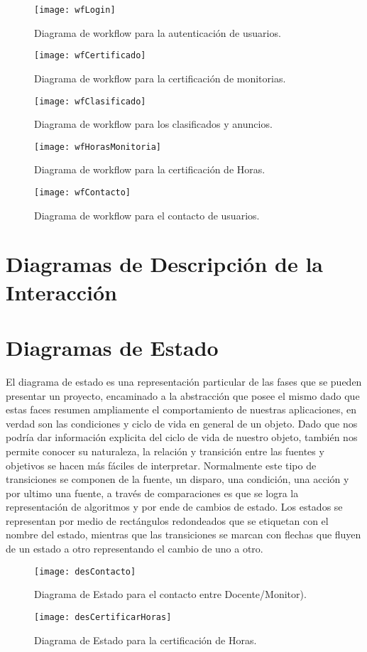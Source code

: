 \begin{figure}[H]
	\centering
	\texttt{[image: wfLogin]}
	\centering
	\caption{Diagrama de workflow para la autenticación de usuarios.}
	\label{fig:wfLogin}
\end{figure}
\begin{figure}[H]
	\centering
	\texttt{[image: wfCertificado]}
	\centering
	\caption{Diagrama de workflow para la certificación de monitorias.}
	\label{fig:wfCertificado}
\end{figure}
\clearpage
\begin{figure}[H]
	\centering
	\texttt{[image: wfClasificado]}
	\centering
	\caption{Diagrama de workflow para los clasificados y anuncios.}
	\label{fig:wfClasificado}
\end{figure}
\begin{figure}[H]
	\centering
	\texttt{[image: wfHorasMonitoria]}
	\centering
	\caption{Diagrama de workflow para la certificación de Horas.}
	\label{fig:wfHorasMonitoria}
\end{figure}
\clearpage
\begin{figure}[H]
	\centering
	\texttt{[image: wfContacto]}
	\centering
	\caption{Diagrama de workflow para el contacto de usuarios.}
	\label{fig:wfContacto}
\end{figure}

\newpage

\section{Diagramas de Descripción de la Interacción}

\newpage

\section{Diagramas de Estado}
El diagrama de estado es una representación particular de las fases que se pueden presentar un proyecto, encaminado a la abstracción que posee el mismo dado que estas faces resumen ampliamente el comportamiento de nuestras aplicaciones, en verdad son las condiciones y ciclo de vida en general de un objeto. 
Dado que nos podría dar información explicita del ciclo de vida de nuestro objeto, también nos permite conocer su naturaleza, la relación y transición entre las fuentes y objetivos se hacen más fáciles de interpretar.
Normalmente este tipo de transiciones se componen de la fuente, un disparo, una condición, una acción y por ultimo una fuente, a través de comparaciones es que se logra la representación de algoritmos y por ende de cambios de estado.  
Los estados se representan por medio de rectángulos redondeados que se etiquetan con el nombre del estado, mientras que las transiciones se marcan con flechas que fluyen de un estado a otro representando el cambio de uno a otro.
\begin{figure}[H]
	\centering
	\texttt{[image: desContacto]}
	\centering
	\caption{Diagrama de Estado para el contacto entre Docente/Monitor).}
	\label{fig:desContacto}
\end{figure}

\begin{figure}[H]
	\centering
	\texttt{[image: desCertificarHoras]}
	\centering
	\caption{Diagrama de Estado para la certificación de Horas.}
	\label{fig:desCertificarHoras}
\end{figure}
\newpage